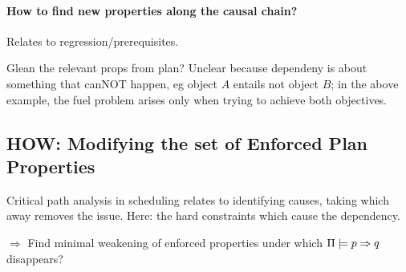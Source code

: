 
%
%



\paragraph{How to find new properties along the causal chain?}

Relates to regression/prerequisites.

Glean the relevant props from plan? Unclear because dependeny is about
something that canNOT happen, eg object $A$ entails not object $B$; in
the above example, the fuel problem arises only when trying to achieve
both objectives.







  


\subsection{HOW: Modifying the set of Enforced Plan Properties}
\label{xpp:identify-causes:enforced}

Critical path analysis in scheduling relates to identifying causes,
taking which away removes the issue. Here: the hard constraints which
cause the dependency.

$\Rightarrow$ Find minimal weakening of enforced properties under
which $\Pi \models p \Rightarrow q$ disappears?


